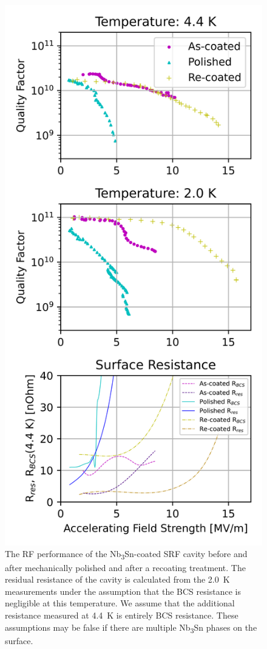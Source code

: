\begin{figure}[htb]%
\centering%
\includegraphics[width=0.8\columnwidth]{../doc/figs/VTS_Test_Graph.png}%
\caption{The RF performance of the Nb\textsubscript{3}Sn-coated SRF cavity before and after mechanically polished and after a recoating treatment. The residual resistance of the cavity is calculated from the 2.0~K measurements under the assumption that the BCS resistance is negligible at this temperature. We assume that the additional resistance measured at 4.4~K is entirely BCS resistance. These assumptions may be false if there are multiple Nb\textsubscript{3}Sn phases on the surface.}%
\label{fig:vtstestgraph}%
\end{figure}

